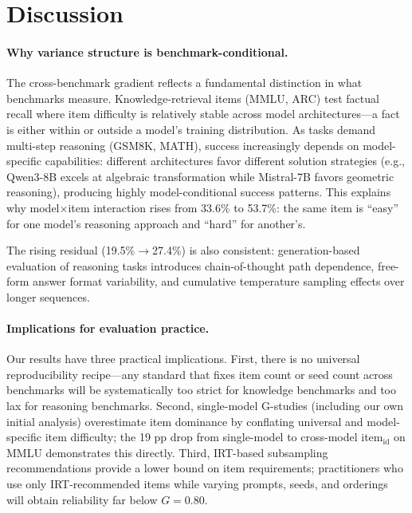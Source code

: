 \documentclass[letterpaper,11pt]{article}
\begin{document}
\section{Discussion}

\paragraph{Why variance structure is benchmark-conditional.}
The cross-benchmark gradient reflects a fundamental distinction in what benchmarks measure.
Knowledge-retrieval items (MMLU, ARC) test factual recall where item difficulty is relatively stable across model architectures---a fact is either within or outside a model's training distribution.
As tasks demand multi-step reasoning (GSM8K, MATH), success increasingly depends on model-specific capabilities: different architectures favor different solution strategies (e.g., Qwen3-8B excels at algebraic transformation while Mistral-7B favors geometric reasoning), producing highly model-conditional success patterns.
This explains why model$\times$item interaction rises from 33.6\% to 53.7\%: the same item is ``easy'' for one model's reasoning approach and ``hard'' for another's.

The rising residual (19.5\%$\to$27.4\%) is also consistent: generation-based evaluation of reasoning tasks introduces chain-of-thought path dependence, free-form answer format variability, and cumulative temperature sampling effects over longer sequences.

\paragraph{Implications for evaluation practice.}
Our results have three practical implications.
First, there is no universal reproducibility recipe---any standard that fixes item count or seed count across benchmarks will be systematically too strict for knowledge benchmarks and too lax for reasoning benchmarks.
Second, single-model G-studies (including our own initial analysis) overestimate item dominance by conflating universal and model-specific item difficulty; the 19 pp drop from single-model to cross-model item$_{\text{id}}$ on MMLU demonstrates this directly.
Third, IRT-based subsampling recommendations \citep{polo2024tinybenchmarks} provide a lower bound on item requirements; practitioners who use only IRT-recommended items while varying prompts, seeds, and orderings will obtain reliability far below $G = 0.80$.
\end{document}
